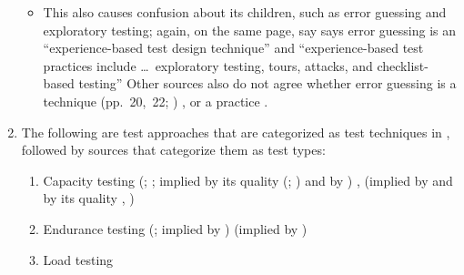 \begin{enumerate}
\begin{itemize}
              \item This also causes confusion about its children, such as
                    error guessing and exploratory testing; again, on the
                    same page,
                    \ifnotpaper
                        \citeauthor{IEEE2022} say
                    \else
                        \cite[p.~34]{IEEE2022} says
                    \fi error guessing is
                    an ``experience-based test design technique'' and
                    ``experience-based test practices include \dots\
                    exploratory testing, tours, attacks, and
                    checklist-based testing''%
                    \else{.}
                    \fi
                    Other sources also do not agree whether error guessing
                    is a technique
                    \ifnotpaper
                        (pp.~20,~22; \citeyear[p.~viii]{IEEE2021})
                    \else
                        \cite[pp.~20,~22]{IEEE2022}, \cite[p.~viii]{IEEE2021}
                    \fi
                    or a practice \citep[p.~5-14]{SWEBOK2024}.
          \end{itemize}
    \item The following are test approaches that are categorized as test
          techniques in \citep[p.~38]{IEEE2021}, followed by sources that
          categorize them as test types:
          \begin{enumerate}
              \item Capacity testing
                    \ifnotpaper
                        (\citealp[p.~22]{IEEE2022};
                        \citeyear[p.~2]{IEEE2013}; implied by its quality
                        (\citealp{ISO_IEC2023a}; \citealp[Tab.~A.1]{IEEE2021})
                        and by \citep[p.~53]{Firesmith2015})
                    \else
                        \cite[p.~22]{IEEE2022}, \cite[p.~2]{IEEE2013} (implied by
                        \cite[p.~53]{Firesmith2015} and by its quality
                        \cite{ISO_IEC2023a}, \cite[Tab.~A.1]{IEEE2021})
                    \fi
              \item Endurance testing
                    \ifnotpaper
                        (\citealp[p.~2]{IEEE2013};
                        implied by \citep[p.~55]{Firesmith2015})
                    \else
                        \cite[p.~2]{IEEE2013}
                        (implied by \cite[p.~55]{Firesmith2015})
                    \fi
              \item Load testing

\end{enumerate}
\end{enumerate}
